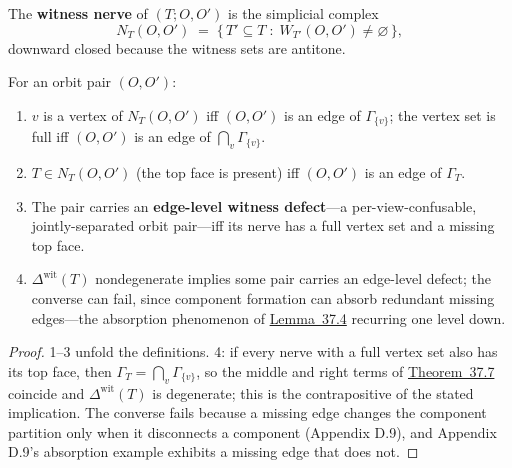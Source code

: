
\begin{thmdef}

The \textbf{witness nerve} of \((T; O, O')\) is the simplicial complex
\[
N_T(O, O') \;=\; \{\, T' \subseteq T \;:\; W_{T'}(O, O') \ne \varnothing \,\},
\]
downward closed because the witness sets are antitone.
\end{thmdef}

\begin{thmplain}

For an orbit pair \((O, O')\):

\begin{enumerate}
\def\labelenumi{\arabic{enumi}.}
\tightlist
\item
  \(v\) is a vertex of \(N_T(O,O')\) iff \((O,O')\) is an edge of \(\Gamma_{\{v\}}\); the vertex set is full iff \((O,O')\) is an edge of \(\bigcap_v \Gamma_{\{v\}}\).
\item
  \(T \in N_T(O,O')\) (the top face is present) iff \((O,O')\) is an edge of \(\Gamma_T\).
\item
  The pair carries an \textbf{edge-level witness defect}---\hspace{0pt}a per-view-confusable, jointly-separated orbit pair---\hspace{0pt}iff its nerve has a full vertex set and a missing top face.
\item
  \(\Delta^{\mathrm{wit}}(T)\) nondegenerate implies some pair carries an edge-level defect; the converse can fail, since component formation can absorb redundant missing edges---\hspace{0pt}the absorption phenomenon of \hyperlink{stmt:37.4}{Lemma~37.4} recurring one level down.
\end{enumerate}
\end{thmplain}

\begin{proof}

1--3 unfold the definitions. 4: if every nerve with a full vertex set also has its top face, then \(\Gamma_T = \bigcap_v \Gamma_{\{v\}}\), so the middle and right terms of \hyperlink{stmt:37.7}{Theorem~37.7} coincide and \(\Delta^{\mathrm{wit}}(T)\) is degenerate; this is the contrapositive of the stated implication. The converse fails because a missing edge changes the component partition only when it disconnects a component (Appendix D.9), and Appendix D.9's absorption example exhibits a missing edge that does not.
\end{proof}

